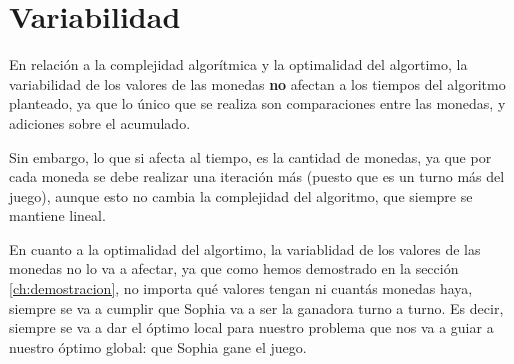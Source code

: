 \section{Variabilidad}

 En relación a la complejidad algorítmica y la optimalidad del algortimo, la variabilidad de los valores de las monedas \textbf{no} afectan a los tiempos del algoritmo planteado, ya que lo único que se realiza son comparaciones entre las monedas, y adiciones sobre el acumulado.

 Sin embargo, lo que si afecta al tiempo, es la cantidad de monedas, ya que por cada moneda se debe realizar una iteración más (puesto que es un turno más del juego), aunque esto no cambia la complejidad del algoritmo, que siempre se mantiene lineal.
 
 En cuanto a la optimalidad del algortimo, la variablidad de los valores de las monedas no lo va a afectar, ya que como hemos demostrado en la sección \ref{ch:demostracion}, no importa qué valores tengan ni cuantás monedas haya, siempre se va a cumplir que Sophia va a ser la ganadora turno a turno. Es decir, siempre se va a dar el óptimo local para nuestro problema que nos va a guiar a nuestro óptimo global: que Sophia gane el juego.





